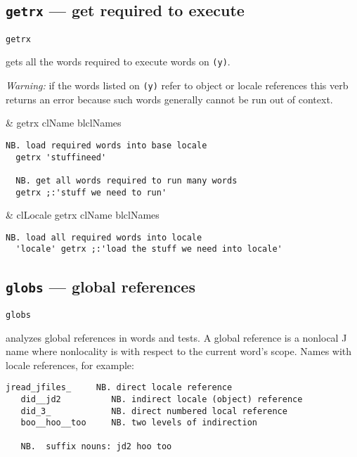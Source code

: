 \subsection{\texttt{getrx} ---  get required to execute}\label{ss:getrx}

\hypertarget{il:getrx}{\texttt{getrx}} gets all the words required to execute words on \texttt{(y)}.
 
\emph{Warning:}  if  the words listed on  \texttt{(y)} refer to  object  or 
locale references  this verb  returns  
an error because such words 
generally cannot be run out of context.

\begin{wordhead}
\monad & getrx clName \argsep blclNames \\
\end{wordhead}
\begin{lstlisting}[frame=single,framerule=0pt] 
  NB. load required words into base locale
  getrx 'stuffineed'       

  NB. get all words required to run many words 
  getrx ;:'stuff we need to run' 
\end{lstlisting}

\begin{wordhead}
\dyad & clLocale getrx clName \argsep blclNames \\
\end{wordhead}
\begin{lstlisting}[frame=single,framerule=0pt] 
  NB. load all required words into locale
  'locale' getrx ;:'load the stuff we need into locale' 
\end{lstlisting}


\subsection{\texttt{globs} --- global references}\label{ss:globs}

\hypertarget{il:globs}{\texttt{globs}} analyzes 
global references 
in words and tests. A global reference is a 
nonlocal J name where nonlocality is with respect to the current word's scope. 
Names with locale references, for example: 

\begin{lstlisting}[frame=single,framerule=0pt] 
   jread_jfiles_     NB. direct locale reference
   did__jd2          NB. indirect locale (object) reference 
   did_3_            NB. direct numbered local reference
   boo__hoo__too     NB. two levels of indirection 
   
   NB.  suffix nouns: jd2 hoo too
\end{lstlisting}
  
